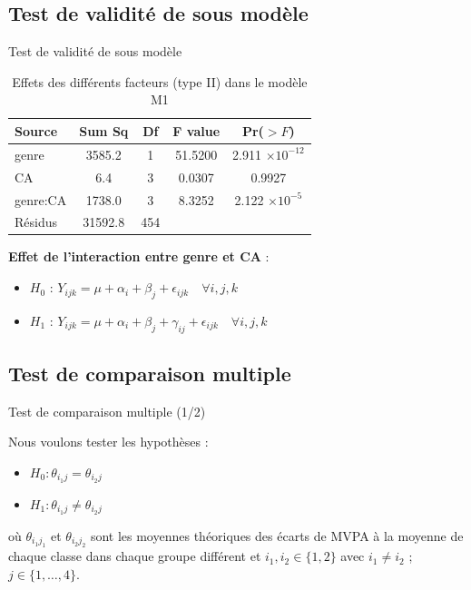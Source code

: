 \documentclass{beamer}
\begin{document}
	\subsection{Test de validité de sous modèle}
	\begin{frame}{Test de validité de sous modèle}
		\begin{table}[H]
			\centering
			\caption{Effets des différents facteurs (type II) dans le modèle M1}
			\begin{tabular}{lcccc}
				\toprule
				Source & Sum Sq & Df & F value & Pr($>F$) \\ 
				\midrule
				genre & 3585.2 & 1 & 51.5200 & 2.911 $\times 10^{-12}$ \\ 
				CA & 6.4 & 3 & 0.0307 & 0.9927 \\ 
				genre:CA & 1738.0 & 3 & 8.3252 & 2.122 $\times 10^{-5}$ \\ 
				Résidus & 31592.8 & 454 & & \\ 
				\bottomrule
			\end{tabular}
			\label{tab:anova_results2}
		\end{table}
		
		\textbf{Effet de l'interaction entre genre et CA} :
		\begin{itemize}
			\item \textbf{$H_0$} : $Y_{ijk} = \mu + \alpha_i + \beta_j + \epsilon_{ijk} \quad \forall i,j,k$ 
			\item \textbf{$H_1$} : $Y_{ijk} = \mu + \alpha_i + \beta_j + \gamma_{ij} + \epsilon_{ijk} \quad \forall i,j,k$
		\end{itemize}
	\end{frame}
	
	\subsection{Test de comparaison multiple}
	\begin{frame}{Test de comparaison multiple (1/2)}
		
		Nous voulons tester les hypothèses :
		\begin{itemize}
			\item $H_0 : \theta_{i_1j} = \theta_{i_2j}$
			\item $H_1 : \theta_{i_1j} \neq \theta_{i_2j}$
		\end{itemize}
		où $\theta_{i_1j_1}$ et $\theta_{i_2j_2}$ sont les moyennes théoriques des écarts de MVPA à la moyenne de chaque classe dans chaque groupe différent et $i_1, i_2 \in \{1, 2\}$ avec $i_1 \neq i_2$ ; $j \in \{1, \ldots, 4\}$. \\
		
	\end{frame}
	
\end{document}
